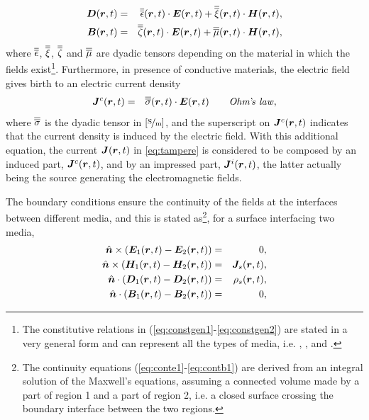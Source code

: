 \begin{eqnarray}
\label{eq:constgen1}
\mbfit{D}(\mbfit{r},t) &= & \dyad{\epsilon}(\mbfit{r},t) \cdot \mbfit{E}(\mbfit{r},t) + \dyad{\xi}(\mbfit{r},t) \cdot \mbfit{H}(\mbfit{r},t), \\
\label{eq:constgen2}
\mbfit{B}(\mbfit{r},t) &= & \dyad{\zeta}(\mbfit{r},t) \cdot \mbfit{E}(\mbfit{r},t) + \dyad{\mu}(\mbfit{r},t) \cdot \mbfit{H}(\mbfit{r},t),
\end{eqnarray}
where $\overline{\overline{\epsilon}}$, $\overline{\overline{\xi}}$, $\overline{\overline{\zeta}}$ and $\overline{\overline{\mu}}$ are dyadic tensors depending on the material in which the fields exist\footnote{The constitutive relations in (\ref{eq:constgen1}-\ref{eq:constgen2}) are stated in a very general form and can represent all the types of media, i.e. , ,  and .}. Furthermore, in presence of conductive materials, the electric field gives birth to an electric current density
\begin{eqnarray}
\mbfit{J}^c(\mbfit{r},t) &= &\dyad{\sigma}(\mbfit{r},t) \cdot \mbfit{E}(\mbfit{r},t) \qquad \mathit{Ohm}\textrm{'}\mathit{\!s \ law},
\end{eqnarray}
where $\overline{\overline{\sigma}}$ is the  dyadic tensor in $\mathrm{[\nicefrac{\mathrm{S}}{m}]}$, and the superscript  on $\mbfit{J}^c(\mbfit{r},t)$ indicates that the current density is induced by the electric field. With this additional equation, the current $\mbfit{J}(\mbfit{r},t)$ in \eqref{eq:tampere} is considered to be composed by an induced part, $\mbfit{J}^c(\mbfit{r},t)$, and by an impressed part, $\mbfit{J}^i(\mbfit{r},t)$, the latter actually being the source generating the electromagnetic fields.
\par The boundary conditions ensure the continuity of the fields at the interfaces between different media, and this is stated as\footnote{The continuity equations (\ref{eq:conte1}-\ref{eq:contb1}) are derived from an integral solution of the Maxwell's equations, assuming a connected volume made by a part of region 1 and a part of region 2, i.e. a closed surface crossing the boundary interface between the two regions.}, for a surface interfacing two media,
\begin{eqnarray}
\hat{\mbfit{n}} \times \left ( \mbfit{E}_1(\mbfit{r},t)-\mbfit{E}_2(\mbfit{r},t) \right ) &= & 0,  \label{eq:conte1} \\
\hat{\mbfit{n}} \times \left ( \mbfit{H}_1(\mbfit{r},t)-\mbfit{H}_2(\mbfit{r},t) \right ) &= & \mbfit{J}_s(\mbfit{r},t), \\
\hat{\mbfit{n}} \cdot \left ( \mbfit{D}_1(\mbfit{r},t)-\mbfit{D}_2(\mbfit{r},t) \right ) &= & \rho_s(\mbfit{r},t), \\
\hat{\mbfit{n}} \cdot \left ( \mbfit{B}_1(\mbfit{r},t)-\mbfit{B}_2(\mbfit{r},t) \right ) &= & 0, \label{eq:contb1}
\end{eqnarray}
